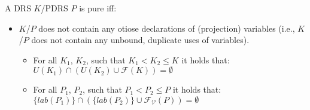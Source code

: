 \begin{definition}[Purity]
A DRS $K$/PDRS $P$ is pure iff:
\begin{itemize}
  \item $K$/$P$ does not contain any otiose declarations of (projection)
    variables (i.e., $K$/$P$ does not contain any unbound, duplicate uses
    of variables).
    \begin{itemize}
      \item For all $K_1$, $K_2$, such that $K_1 < K_2 \leq K$ it holds that:
        $U(K_1) \cap (U(K_2) \cup \mathcal{F}(K)) = \emptyset$
      \item For all $P_1$, $P_2$, such that $P_1 < P_2 \leq P$ it holds that: 
        $\{lab(P_1)\} \cap (\{lab(P_2)\} \cup \mathcal{F_V}(P)) = \emptyset$
    \end{itemize}
\end{itemize}
\end{definition}

